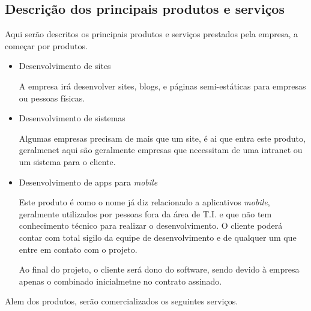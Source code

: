 \subsection{Descrição dos principais produtos e serviços}
	Aqui serão descritos os principais produtos e serviços prestados pela empresa, a começar por produtos.

	\begin{itemize} 
		\item{Desenvolvimento de sites}

			A empresa irá desenvolver sites, blogs, e páginas semi-estáticas para empresas ou pessoas físicas.

		\item{Desenvolvimento de sistemas} 
		
			Algumas empresas precisam de mais que um site, é ai que entra este produto, geralmenet aqui são geralmente empresas que necessitam de uma intranet ou um sistema para o cliente.

		\item{Desenvolvimento de apps para \textit{mobile}}

			Este produto é como o nome já diz relacionado a aplicativos \textit{mobile}, geralmente utilizados por pessoas fora da área de T.I. e que não tem conhecimento técnico para realizar o desenvolvimento. O cliente poderá contar com total sigilo da equipe de desenvolvimento e de qualquer um que entre em contato com o projeto.

			Ao final do projeto, o cliente será dono do software, sendo devido à empresa apenas o combinado inicialmetne no contrato assinado.
	\end{itemize}

	Alem dos produtos, serão comercializados os seguintes serviços.

